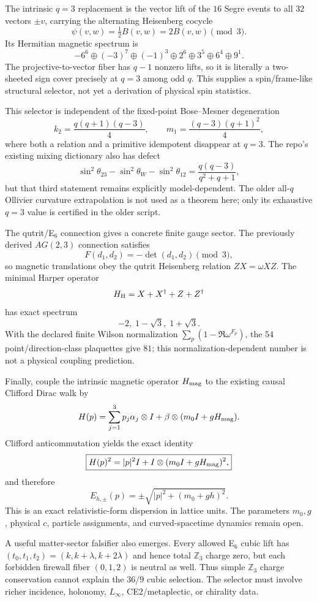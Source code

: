 The intrinsic $q=3$ replacement is the vector lift of the $16$ Segre events to all $32$
vectors $\pm v$, carrying the alternating Heisenberg cocycle
\[
 \psi(v,w)=\tfrac12 B(v,w)=2B(v,w)\pmod3.
\]
Its Hermitian magnetic spectrum is
\[
\boxed{
 -6^6\oplus(-3)^7\oplus(-1)^3\oplus2^6\oplus3^5\oplus6^4\oplus9^1.}
\]
The projective-to-vector fiber has $q-1$ nonzero lifts, so it is literally a two-sheeted
sign cover precisely at $q=3$ among odd $q$.  This supplies a spin/frame-like structural
selector, not yet a derivation of physical spin statistics.

This selector is independent of the fixed-point Bose--Mesner degeneration
\[
 k_2=\frac{q(q+1)(q-3)}4,
 \qquad
 m_1=\frac{(q-3)(q+1)^2}{4},
\]
where both a relation and a primitive idempotent disappear at $q=3$.  The repo's existing
mixing dictionary also has defect
\[
 \sin^2\theta_{23}-\sin^2\theta_W-\sin^2\theta_{12}
 =\frac{q(q-3)}{q^2+q+1},
\]
but that third statement remains explicitly model-dependent.  The older all-$q$ Ollivier
curvature extrapolation is not used as a theorem here; only its exhaustive $q=3$ value is
certified in the older script.

The qutrit/E$_6$ connection gives a concrete finite gauge sector.  The previously derived
$AG(2,3)$ connection satisfies
\[
 F(d_1,d_2)=-\det(d_1,d_2)\pmod3,
\]
so magnetic translations obey the qutrit Heisenberg relation $ZX=\omega XZ$.  The minimal
Harper operator
\[
 H_{\rm H}=X+X^\dagger+Z+Z^\dagger
\]
has exact spectrum
\[
\boxed{-2,\;1-\sqrt3,\;1+\sqrt3.}
\]
With the declared finite Wilson normalization $\sum_p(1-\Re\omega^{F_p})$, the $54$
point/direction-class plaquettes give $81$; this normalization-dependent number is not a
physical coupling prediction.

Finally, couple the intrinsic magnetic operator $H_{\rm mag}$ to the existing causal
Clifford Dirac walk by
\[
 H(p)=\sum_{j=1}^3p_j\alpha_j\otimes I
 +\beta\otimes(m_0I+gH_{\rm mag}).
\]
Clifford anticommutation yields the exact identity
\[
\boxed{H(p)^2=|p|^2I+I\otimes(m_0I+gH_{\rm mag})^2,}
\]
and therefore
\[
\boxed{E_{h,\pm}(p)=\pm\sqrt{|p|^2+(m_0+gh)^2}.}
\]
This is an exact relativistic-form dispersion in lattice units.  The parameters $m_0,g$,
physical $c$, particle assignments, and curved-spacetime dynamics remain open.

A useful matter-sector falsifier also emerges.  Every allowed E$_6$ cubic lift has
$(t_0,t_1,t_2)=(k,k+\lambda,k+2\lambda)$ and hence total $\mathbb Z_3$ charge zero, but
each forbidden firewall fiber $(0,1,2)$ is neutral as well.  Thus simple $\mathbb Z_3$
charge conservation cannot explain the $36/9$ cubic selection.  The selector must involve
richer incidence, holonomy, $L_\infty$, CE2/metaplectic, or chirality data.

